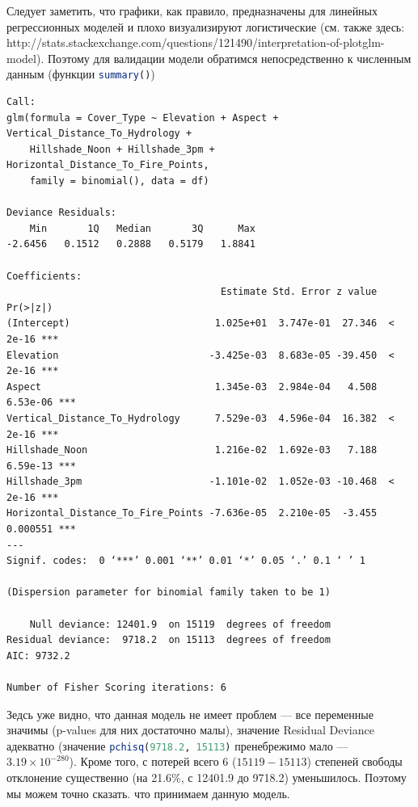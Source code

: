 \documentclass[12pt]{article}
\begin{document}
Следует заметить, что графики, как правило, предназначены для линейных регрессионных моделей и плохо визуализируют логистические
(см. также здесь:\\ http://stats.stackexchange.com/questions/121490/interpretation-of-plotglm-model).
Поэтому для валидации модели обратимся непосредственно к численным данным (функции \lstinline[language=r]|summary()|)
\begin{lstlisting}
Call:
glm(formula = Cover_Type ~ Elevation + Aspect + Vertical_Distance_To_Hydrology + 
    Hillshade_Noon + Hillshade_3pm + Horizontal_Distance_To_Fire_Points, 
    family = binomial(), data = df)

Deviance Residuals: 
    Min       1Q   Median       3Q      Max  
-2.6456   0.1512   0.2888   0.5179   1.8841  

Coefficients:
                                     Estimate Std. Error z value Pr(>|z|)    
(Intercept)                         1.025e+01  3.747e-01  27.346  < 2e-16 ***
Elevation                          -3.425e-03  8.683e-05 -39.450  < 2e-16 ***
Aspect                              1.345e-03  2.984e-04   4.508 6.53e-06 ***
Vertical_Distance_To_Hydrology      7.529e-03  4.596e-04  16.382  < 2e-16 ***
Hillshade_Noon                      1.216e-02  1.692e-03   7.188 6.59e-13 ***
Hillshade_3pm                      -1.101e-02  1.052e-03 -10.468  < 2e-16 ***
Horizontal_Distance_To_Fire_Points -7.636e-05  2.210e-05  -3.455 0.000551 ***
---
Signif. codes:  0 ‘***’ 0.001 ‘**’ 0.01 ‘*’ 0.05 ‘.’ 0.1 ‘ ’ 1

(Dispersion parameter for binomial family taken to be 1)

    Null deviance: 12401.9  on 15119  degrees of freedom
Residual deviance:  9718.2  on 15113  degrees of freedom
AIC: 9732.2

Number of Fisher Scoring iterations: 6
\end{lstlisting}
Зедсь уже видно, что данная модель не имеет проблем --- все переменные значимы (p-values для них достаточно малы), значение 
Residual Deviance адекватно (значение \lstinline[language=r]|pchisq(9718.2, 15113)| пренебрежимо мало --- $3.19 \times 10^{-280}$).
Кроме того, с потерей всего 6 ($15119-15113$) степеней свободы отклонение существенно (на 21.6\%, с 12401.9 до 9718.2) уменьшилось.
Поэтому мы можем точно сказать. что принимаем данную модель.
\end{document}

